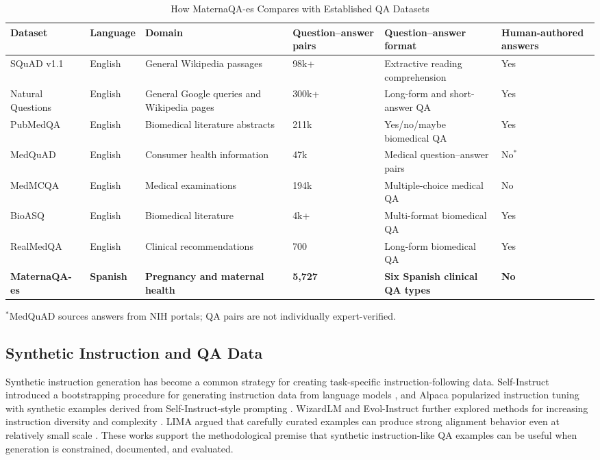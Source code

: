 \documentclass[conference]{IEEEtran}
\begin{document}
\begin{table}[t]
\caption{How MaternaQA-es Compares with Established QA Datasets}
\label{tab:related_datasets}
\centering
\scriptsize
\setlength{\tabcolsep}{3pt}
\begin{tabular}{|p{}|p{}|p{}|p{}|p{}|p{}|}
\hline
\textbf{Dataset} & \textbf{Language} & \textbf{Domain} & \textbf{Question--answer pairs} & \textbf{Question--answer format} & \textbf{Human-authored answers} \\
\hline
SQuAD v1.1    & English & General Wikipedia passages & 98k+ & Extractive reading comprehension & Yes \\
Natural Questions & English & General Google queries and Wikipedia pages & 300k+ & Long-form and short-answer QA & Yes \\
PubMedQA      & English & Biomedical literature abstracts & 211k  & Yes/no/maybe biomedical QA & Yes \\
MedQuAD       & English & Consumer health information & 47k   & Medical question--answer pairs & No$^*$ \\
MedMCQA       & English & Medical examinations & 194k  & Multiple-choice medical QA & No \\
BioASQ        & English & Biomedical literature & 4k+   & Multi-format biomedical QA & Yes \\
RealMedQA     & English & Clinical recommendations & 700   & Long-form biomedical QA & Yes \\
\textbf{MaternaQA-es} & \textbf{Spanish} & \textbf{Pregnancy and maternal health} & \textbf{5,727} & \textbf{Six Spanish clinical QA types} & \textbf{No} \\
\hline
\end{tabular}

\vspace{4pt}
\footnotesize $^*$MedQuAD sources answers from NIH portals; QA pairs are not individually expert-verified.

\end{table}

\subsection{Synthetic Instruction and QA Data}
Synthetic instruction generation has become a common strategy for creating task-specific instruction-following data. Self-Instruct introduced a bootstrapping procedure for generating instruction data from language models \cite{Wang2023SelfInstruct}, and Alpaca popularized instruction tuning with synthetic examples derived from Self-Instruct-style prompting \cite{Taori2023Alpaca}. WizardLM and Evol-Instruct further explored methods for increasing instruction diversity and complexity \cite{Xu2023WizardLM}. LIMA argued that carefully curated examples can produce strong alignment behavior even at relatively small scale \cite{Zhou2023LIMA}. These works support the methodological premise that synthetic instruction-like QA examples can be useful when generation is constrained, documented, and evaluated.
\end{document}
